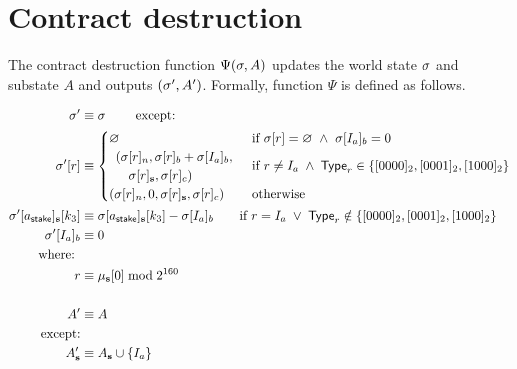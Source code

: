 

\section{Contract destruction}\label{sec:contract_destruct}

The contract destruction function $\Psi(\mathbf{\sigma},A)$ updates the world state $\mathbf{\sigma}$ and substate $A$ and outputs $(\mathbf{\sigma}',A')$. Formally, function $\Psi$ is defined as follows.

\begin{align}
	\st'  &\eqdef \st \qquad \mbox{ except:}\\
	\st'[r] &\equiv \begin{cases}
		\varnothing &\text{if}\ \st[r] = \varnothing\ \wedge\ \st[I_{a}]_{b} = 0\\
		\begin{array}{l}
			(\st[r]_{n}, \st[r]_{b} + \st[I_{a}]_{b}, \\
			\quad\st[r]_{\mathbf{s}}, \st[r]_{c})
			\end{array} & \text{if}\ r \neq I_{a} \; \land \; \mathsf{Type}_r\in \{[0000]_2,[0001]_2,[1000]_2\}\\
			(\st[r]_{n}, 0, \st[r]_{\mathbf{s}}, \st[r]_{c}) & \text{otherwise}
	\end{cases}\\
	\st'[a_{\sf stake}]_{\bf s}[k_3] &\eqdef \st[a_{\sf stake}]_{\bf s}[k_3] - \st[I_a]_{b} \qquad \text{if}\ r = I_{a} \; \lor \; \mathsf{Type}_r\notin \{[0000]_2,[0001]_2,[1000]_2\}   \\
	\st'[I_{a}]_{b} &\eqdef 0 \\
		\mbox{where: } &\\ 
		 r &\eqdef \mst_{\mathbf{s}}[0] \bmod 2^{160} \\
	\notag \\
	A' & \eqdef A \\
	\mbox{except:} & \\ 
	A'_{\mathbf{s}} &\eqdef A_{\mathbf{s}} \cup \{I_a\}
\end{align}